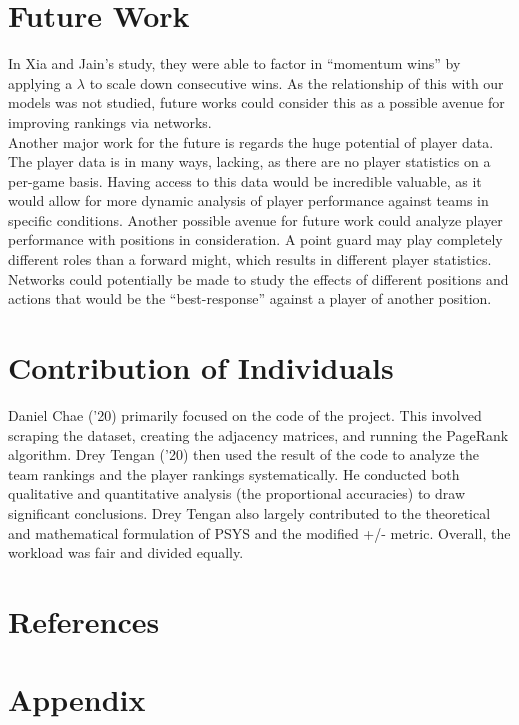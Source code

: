 \documentclass[12pt]{article}%
\begin{document}
\section{Future Work}
\label{fw}
\null\quad\quad In Xia and Jain's study, they were able to factor in ``momentum wins'' by applying a $\lambda$ to scale down consecutive wins. As the relationship of this with our models was not studied, future works could consider this as a possible avenue for improving rankings via networks. \\
\null\quad\quad Another major work for the future is regards the huge potential of player data. The player data is in many ways, lacking, as there are no player statistics on a per-game basis. Having access to this data would be incredible valuable, as it would allow for more dynamic analysis of player performance against teams in specific conditions. Another possible avenue for future work could analyze player performance with positions in consideration. A point guard may play completely different roles than a forward might, which results in different player statistics. Networks could potentially be made to study the effects of different positions and actions that would be the ``best-response'' against a player of another position.

\section{Contribution of Individuals}
\null\quad\quad Daniel Chae ('20) primarily focused on the code of the project. This involved scraping the dataset, creating the adjacency matrices, and running the PageRank algorithm. Drey Tengan ('20) then used the result of the code to analyze the team rankings and the player rankings systematically. He conducted both qualitative and quantitative analysis (the proportional accuracies) to draw significant conclusions. Drey Tengan also largely contributed to the theoretical and mathematical formulation of PSYS and the modified +/- metric. Overall, the workload was fair and divided equally.

\section{References}
\printbibliography[heading=none]
\newpage
\section{Appendix}
\end{document}
